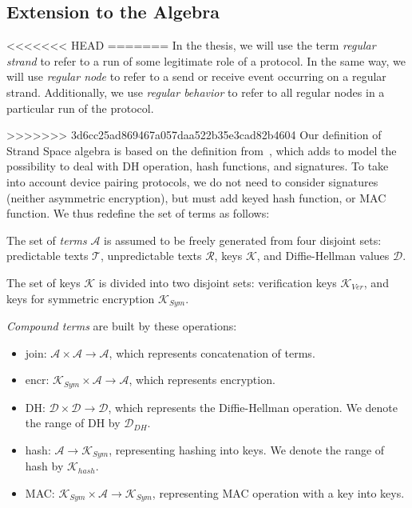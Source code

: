 \subsection{Extension to the Algebra}

<<<<<<< HEAD
=======
In the thesis, we will use the term \emph{regular strand} to refer to a run of some legitimate role of a protocol. In the same way, we will use \emph{regular node} to refer to a send or receive event occurring on a regular strand. Additionally, we use \emph{regular behavior} to refer to all regular nodes in a particular run of the protocol.

>>>>>>> 3d6cc25ad869467a057daa522b35e3cad82b4604
Our definition of Strand Space algebra is based on the definition from~\cite{1212716}, which adds to model the possibility to deal with DH operation, hash functions, and signatures. To take into account device pairing protocols, we do not need  to consider signatures (neither asymmetric encryption), but must add keyed hash function, or MAC function. We thus redefine the set of terms as follows:

\begin{Definition}
The set of \emph{terms} $\mathcal{A}$ is assumed to be freely generated from four disjoint sets: predictable texts $\mathcal{T}$, unpredictable texts $\mathcal{R}$,  keys $\mathcal{K}$, and Diffie-Hellman values $\mathcal{D}$.

The set of keys $\mathcal{K}$ is divided into two disjoint sets: verification keys $\mathcal{K}_{Ver}$, and keys for symmetric encryption $\mathcal{K}_{Sym}$.

\emph{Compound terms} are built by these operations:
\begin{itemize} 
\item join: $\mathcal{A} \times \mathcal{A} \rightarrow \mathcal{A}$, which represents concatenation of terms. 
\item encr: $\mathcal{K}_{Sym} \times \mathcal{A} \rightarrow \mathcal{A}$, which represents encryption. 
\item DH: $\mathcal{D} \times \mathcal{D} \rightarrow \mathcal{D}$, which represents the Diffie-Hellman operation. We denote the range of DH by $\mathcal{D}_{DH}$.
\item hash: $\mathcal{A} \rightarrow \mathcal{K}_{Sym}$, representing hashing into keys. We denote the range of hash by $\mathcal{K}_{hash}$. 
\item MAC: $\mathcal{K}_{Sym} \times \mathcal{A}  \rightarrow \mathcal{K}_{Sym}$, representing MAC operation with a key into keys.
\end{itemize}
\end{Definition} 

